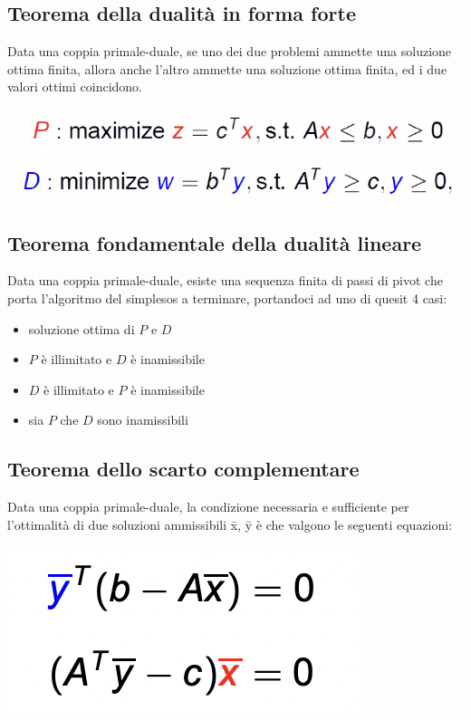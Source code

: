 \documentclass[11pt, oneside]{article}   	%
\begin{document}
\subsection{Teorema della dualità in forma forte}
Data una coppia primale-duale, se uno dei due problemi ammette una soluzione ottima finita, allora anche l'altro ammette una soluzione ottima finita, ed i due valori ottimi coincidono.
\begin{center}
\includegraphics[scale=1]{dualitaf}
\end{center}

\subsection{Teorema fondamentale della dualità lineare}
Data una coppia primale-duale, esiste una sequenza finita di passi di pivot che porta l'algoritmo del simplesos a terminare, portandoci ad uno di quesit 4 casi:
\begin{itemize}
\item soluzione ottima di $P$ e $D$
\item $P$ è illimitato e $D$ è inamissibile
\item $D$ è illimitato e $P$ è inamissibile
\item sia $P$ che $D$ sono inamissibili
\end{itemize}
\subsection{Teorema dello scarto complementare}
Data una coppia primale-duale, la condizione necessaria e sufficiente per l'ottimalità di due soluzioni ammissibili \={x}, \={y}  è che valgono le seguenti equazioni:
\begin{center}
\includegraphics[scale=1]{scarto}
\end{center}
\end{document}
